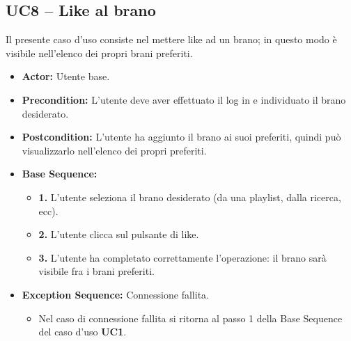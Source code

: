 \subsection{UC8 -- Like al brano}
Il presente caso d'uso consiste nel mettere like ad un brano; in questo modo 
è visibile nell'elenco dei propri brani preferiti.
\begin{itemize}
    \item \textbf{Actor:} Utente base.
    \item \textbf{Precondition:} L'utente deve aver effettuato il log in e individuato il brano desiderato.
    \item \textbf{Postcondition:} L'utente ha aggiunto il brano ai suoi preferiti, quindi può visualizzarlo nell'elenco dei propri preferiti.
    \item \textbf{Base Sequence:}
    \begin{itemize}
        \item \textbf{1.} L'utente seleziona il brano desiderato (da una playlist, dalla ricerca, ecc).
        \item \textbf{2.} L'utente clicca sul pulsante di like.
        \item \textbf{3.} L'utente ha completato correttamente l'operazione: il brano sarà visibile fra i brani preferiti.
    \end{itemize}
    \item \textbf{Exception Sequence:} Connessione fallita.
    \begin{itemize}
        \item Nel caso di connessione fallita si ritorna al passo 1 della Base Sequence del caso d'uso \textbf{UC1}.
    \end{itemize}
\end{itemize}
\vspace{1cm}

